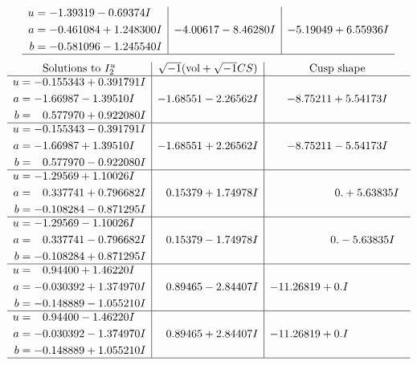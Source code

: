 \documentclass[1p]{elsarticle_modified}
\theoremstyle{definition}
\newcommand{\I}{\sqrt{-1}}
\begin{document}
$$\begin{array}{c|c|c}
\begin{aligned}
u &= -1.39319 - 0.69374 I \\
a &= -0.461084 + 1.248300 I \\
b &= -0.581096 - 1.245540 I\end{aligned}
 & -4.00617 - 8.46280 I & -5.19049 + 6.55936 I\\
 \hline 
 \end{array}$$\newpage$$\begin{array}{c|c|c}  
\text{Solutions to }I^u_{2}& \I (\text{vol} + \sqrt{-1}CS) & \text{Cusp shape}\\
 \hline 
\begin{aligned}
u &= -0.155343 + 0.391791 I \\
a &= -1.66987 - 1.39510 I \\
b &= \phantom{-}0.577970 + 0.922080 I\end{aligned}
 & -1.68551 - 2.26562 I & -8.75211 + 5.54173 I \\ \hline\begin{aligned}
u &= -0.155343 - 0.391791 I \\
a &= -1.66987 + 1.39510 I \\
b &= \phantom{-}0.577970 - 0.922080 I\end{aligned}
 & -1.68551 + 2.26562 I & -8.75211 - 5.54173 I \\ \hline\begin{aligned}
u &= -1.29569 + 1.10026 I \\
a &= \phantom{-}0.337741 + 0.796682 I \\
b &= -0.108284 - 0.871295 I\end{aligned}
 & \phantom{-}0.15379 + 1.74978 I & \phantom{-0.000000 -}0. + 5.63835 I \\ \hline\begin{aligned}
u &= -1.29569 - 1.10026 I \\
a &= \phantom{-}0.337741 - 0.796682 I \\
b &= -0.108284 + 0.871295 I\end{aligned}
 & \phantom{-}0.15379 - 1.74978 I & \phantom{-0.000000 } 0. - 5.63835 I \\ \hline\begin{aligned}
u &= \phantom{-}0.94400 + 1.46220 I \\
a &= -0.030392 + 1.374970 I \\
b &= -0.148889 - 1.055210 I\end{aligned}
 & \phantom{-}0.89465 - 2.84407 I & -11.26819 + 0. I\phantom{ +0.000000I} \\ \hline\begin{aligned}
u &= \phantom{-}0.94400 - 1.46220 I \\
a &= -0.030392 - 1.374970 I \\
b &= -0.148889 + 1.055210 I\end{aligned}
 & \phantom{-}0.89465 + 2.84407 I & -11.26819 + 0. I\phantom{ +0.000000I}\\
 \hline 
 \end{array}$$\newpage
\end{document}
